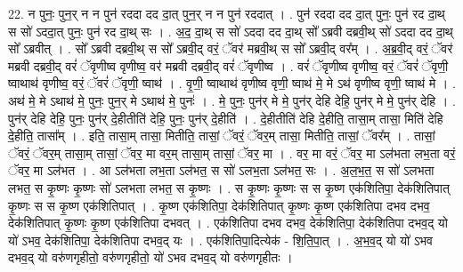 \documentclass[17pt]{extarticle}
\begin{document}
22. न पुनः॒ पुन॒र् न न पुन॑ रददा दद दा॒त् पुन॒र् न न पुन॑ रददात् । . पुन॑ रददा दद दा॒त् पुनः॒ पुन॑ रद दा॒थ् स सो॑ ऽददा॒त् पुनः॒ पुन॑ रद दा॒थ् सः । . अ॒द॒ दा॒थ् स सो॑ ऽददा दद दा॒थ् सो᳚ ऽब्रवी दब्रवी॒थ् सो॑ ऽददा दद दा॒थ् सो᳚ ऽब्रवीत् । . सो᳚ ऽब्रवी दब्रवी॒थ् स सो᳚ ऽब्रवी॒द् वरं॒ ॅवर॑ मब्रवी॒थ् स सो᳚ ऽब्रवी॒द् वर᳚म् । . अ॒ब्र॒वी॒द् वरं॒ ॅवर॑ मब्रवी दब्रवी॒द् वरं॑ ॅवृणीष्व वृणीष्व॒ वर॑ मब्रवी दब्रवी॒द् वरं॑ ॅवृणीष्व । . वरं॑ ॅवृणीष्व वृणीष्व॒ वरं॒ ॅवरं॑ ॅवृणी॒ ष्वाथाथ॑ वृणीष्व॒ वरं॒ ॅवरं॑ ॅवृणी॒ ष्वाथ॑ । . वृ॒णी॒ ष्वाथाथ॑ वृणीष्व वृणी॒ ष्वाथ॑ मे॒ मे ऽथ॑ वृणीष्व वृणी॒ ष्वाथ॑ मे । . अथ॑ मे॒ मे ऽथाथ॑ मे॒ पुनः॒ पुन॒र् मे ऽथाथ॑ मे॒ पुनः॑ । . मे॒ पुनः॒ पुन॑र् मे मे॒ पुन॑र् देहि देहि॒ पुन॑र् मे मे॒ पुन॑र् देहि । . पुन॑र् देहि देहि॒ पुनः॒ पुन॑र् दे॒हीतीति॑ देहि॒ पुनः॒ पुन॑र् दे॒हीति॑ । . दे॒हीतीति॑ देहि दे॒हीति॒ तासा॒म् तासा॒ मिति॑ देहि दे॒हीति॒ तासा᳚म् । . इति॒ तासा॒म् तासा॒ मितीति॒ तासां॒ ॅवरं॒ ॅवर॒म् तासा॒ मितीति॒ तासां॒ ॅवर᳚म् । . तासां॒ ॅवरं॒ ॅवर॒म् तासा॒म् तासां॒ ॅवर॒ मा वर॒म् तासा॒म् तासां॒ ॅवर॒ मा । . वर॒ मा वरं॒ ॅवर॒ मा ऽल॑भता लभ॒ता वरं॒ ॅवर॒ मा ऽल॑भत । . आ ऽल॑भता लभ॒ता ऽल॑भत॒ स सो॑ ऽलभ॒ता ऽल॑भत॒ सः । . अ॒ल॒भ॒त॒ स सो॑ ऽलभता लभत॒ स कृ॒ष्णः कृ॒ष्णः सो॑ ऽलभता लभत॒ स कृ॒ष्णः । . स कृ॒ष्णः कृ॒ष्णः स स कृ॒ष्ण एक॑शितिपा॒ देक॑शितिपात् कृ॒ष्णः स स कृ॒ष्ण एक॑शितिपात् । . कृ॒ष्ण एक॑शितिपा॒ देक॑शितिपात् कृ॒ष्णः कृ॒ष्ण एक॑शितिपा दभव दभव॒ देक॑शितिपात् कृ॒ष्णः कृ॒ष्ण एक॑शितिपा दभवत् । . एक॑शितिपा दभव दभव॒ देक॑शितिपा॒ देक॑शितिपा दभव॒द् यो यो॑ ऽभव॒ देक॑शितिपा॒ देक॑शितिपा दभव॒द् यः । . एक॑शितिपा॒दित्येक॑ - शि॒ति॒पा॒त् । . अ॒भ॒व॒द् यो यो॑ ऽभव दभव॒द् यो वरु॑णगृहीतो॒ वरु॑णगृहीतो॒ यो॑ ऽभव दभव॒द् यो वरु॑णगृहीतः । \newline
\end{document}
